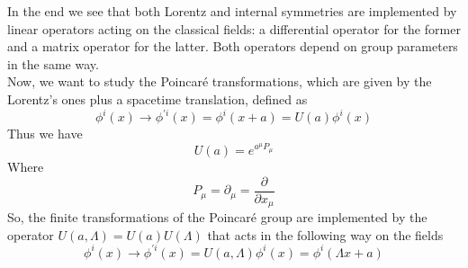 \documentclass[a4paper,10pt]{article}
\begin{document}
In the end we see that both Lorentz and internal symmetries are implemented by linear operators acting on the classical fields: a differential operator for the former and a matrix
operator for the latter. Both operators depend on group parameters in the same way.\\
Now, we want to study the Poincaré transformations, which are given by the Lorentz's ones plus a spacetime translation, defined as
\begin{equation}
 \phi^i(x)\rightarrow\phi^{'i}(x)= \phi^i(x+a) = U(a) \phi^i(x)
\end{equation}
Thus we have
\begin{equation}
 U(a)=e^{a^\mu P_\mu}
\end{equation}
Where 
\begin{equation}
 P_\mu= \partial_\mu= \frac{\partial}{\partial x_\mu}
\end{equation}
So, the finite transformations of the Poincaré group are implemented by the operator 
 $U(a,\Lambda)=U(a)U(\Lambda)$
that acts in the following way on the fields
\begin{equation}
 \phi^i(x)\rightarrow\phi^{'i}(x)=U(a,\Lambda) \phi^i(x) =\phi^i(\Lambda x +a)
\end{equation}
\end{document}
